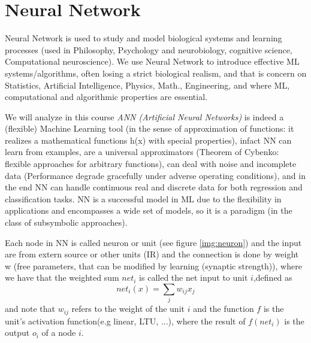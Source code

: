 \chapter{Neural Network}
Neural Network is used to study and model biological systems and learning processes (used in Philosophy, Psychology and neurobiology, cognitive science, Computational neuroscience).
We use Neural Network to introduce effective ML systems/algorithms, often losing a strict biological realism, and that is concern on Statistics, Artificial Intelligence, Physics, Math., Engineering, and where ML, computational  and algorithmic properties are essential.

We will analyze in this course \emph{ANN (Artificial Neural Networks)} is indeed a (flexible) Machine Learning tool (in the sense of approximation of functions:
it realizes a mathematical functions h(x) with special properties), infact NN can learn from examples, are a universal approximators (Theorem of Cybenko: flexible approaches for arbitrary functions),
can deal with noise and incomplete data (Performance degrade gracefully under adverse operating conditions), and in the end NN can handle  continuous real and 
discrete data for both regression and classification tasks.\newline
NN is a successful model in ML due to the flexibility in applications and encompasses a wide set of models, so it is a paradigm (in the class of subsymbolic approaches).

Each node in NN is called neuron or unit (see figure \ref{img:neuron}) and the input are from extern source or other units (IR) and the connection is done by weight w
(free parameters, that can be modified by learning (synaptic strength)), where we have that the weighted sum $net_i$ is called the net input to unit $i$,defined as 
\[ net_i(x) = \sum _j w_{ij} x_j \]
and note that $w_{ij}$ refers to the weight of the unit $i$ and the function $f$ is the unit's activation function(e.g linear, LTU, ...), where the result
of $f(net_i)$ is the output $o_i$ of a node $i$.

